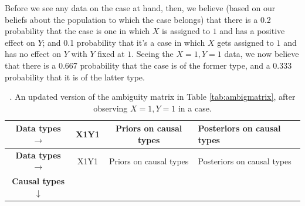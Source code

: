 \documentclass[
  12pt,
]{book}
\begin{document}
Before we see any data on the case at hand, then, we believe (based on our beliefs about the population to which the case belongs) that there is a 0.2 probability that the case is one in which \(X\) is assigned to \(1\) and has a positive effect on \(Y\); and 0.1 probability that it's a case in which \(X\) gets assigned to \(1\) and has no effect on \(Y\) with \(Y\) fixed at \(1\). Seeing the \(X=1, Y=1\) data, we now believe that there is a 0.667 probability that the case is of the former type, and a 0.333 probability that it is of the latter type.

\begin{longtable}[]{@{}cccl@{}}
\caption{\label{tab:ambigupdate}. An updated version of the ambiguity matrix in Table \ref{tab:ambigmatrix}, after observing \(X=1, Y=1\) in a case.}\tabularnewline
\toprule
\begin{minipage}[b]{0.31\columnwidth}\centering
\textbf{Data types} \(\rightarrow\)\strut
\end{minipage} & \begin{minipage}[b]{0.06\columnwidth}\centering
X1Y1\strut
\end{minipage} & \begin{minipage}[b]{0.24\columnwidth}\centering
Priors on causal types\strut
\end{minipage} & \begin{minipage}[b]{0.28\columnwidth}\raggedright
Posteriors on causal types\strut
\end{minipage}\tabularnewline
\midrule
\endfirsthead
\toprule
\begin{minipage}[b]{0.31\columnwidth}\centering
\textbf{Data types} \(\rightarrow\)\strut
\end{minipage} & \begin{minipage}[b]{0.06\columnwidth}\centering
X1Y1\strut
\end{minipage} & \begin{minipage}[b]{0.24\columnwidth}\centering
Priors on causal types\strut
\end{minipage} & \begin{minipage}[b]{0.28\columnwidth}\raggedright
Posteriors on causal types\strut
\end{minipage}\tabularnewline
\midrule
\endhead
\begin{minipage}[t]{0.31\columnwidth}\centering
\textbf{Causal types} \(\downarrow\)\strut
\end{minipage} & \begin{minipage}[t]{0.06\columnwidth}\centering
\strut
\end{minipage} & \begin{minipage}[t]{0.24\columnwidth}\centering

\end{minipage}
\end{longtable}
\end{document}
